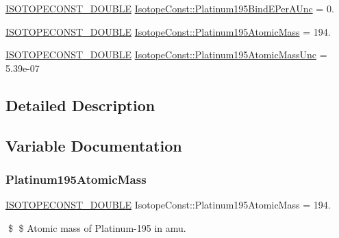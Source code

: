 \begin{DoxyCompactItemize}
\mbox{\hyperlink{group___isotope_const-_macros_ga8f45a7272ce02c0b4c65c44636ed719a}{I\+S\+O\+T\+O\+P\+E\+C\+O\+N\+S\+T\+\_\+\+D\+O\+U\+B\+LE}} \mbox{\hyperlink{group___isotope_const-_platinum-_pt195_ga403309e732bf202ee4ade9b29260ec3d}{Isotope\+Const\+::\+Platinum195\+Bind\+E\+Per\+A\+Unc}} = 0.
\item 
\mbox{\hyperlink{group___isotope_const-_macros_ga8f45a7272ce02c0b4c65c44636ed719a}{I\+S\+O\+T\+O\+P\+E\+C\+O\+N\+S\+T\+\_\+\+D\+O\+U\+B\+LE}} \mbox{\hyperlink{group___isotope_const-_platinum-_pt195_ga89539f9dc45f6b7aaa581a69041981d6}{Isotope\+Const\+::\+Platinum195\+Atomic\+Mass}} = 194.
\item 
\mbox{\hyperlink{group___isotope_const-_macros_ga8f45a7272ce02c0b4c65c44636ed719a}{I\+S\+O\+T\+O\+P\+E\+C\+O\+N\+S\+T\+\_\+\+D\+O\+U\+B\+LE}} \mbox{\hyperlink{group___isotope_const-_platinum-_pt195_ga58e77183e6f403d50a5ec69f3e57a89a}{Isotope\+Const\+::\+Platinum195\+Atomic\+Mass\+Unc}} = 5.\+39e-\/07
\end{DoxyCompactItemize}


\subsection{Detailed Description}


\subsection{Variable Documentation}
\mbox{\label{group___isotope_const-_platinum-_pt195_ga89539f9dc45f6b7aaa581a69041981d6}} 
\subsubsection{\texorpdfstring{Platinum195\+Atomic\+Mass}{Platinum195AtomicMass}}
{\footnotesize\ttfamily \mbox{\hyperlink{group___isotope_const-_macros_ga8f45a7272ce02c0b4c65c44636ed719a}{I\+S\+O\+T\+O\+P\+E\+C\+O\+N\+S\+T\+\_\+\+D\+O\+U\+B\+LE}} Isotope\+Const\+::\+Platinum195\+Atomic\+Mass = 194.}

\$ \$ Atomic mass of Platinum-\/195 in amu. \mbox{\label{group___isotope_const-_platinum-_pt195_ga58e77183e6f403d50a5ec69f3e57a89a}} 
